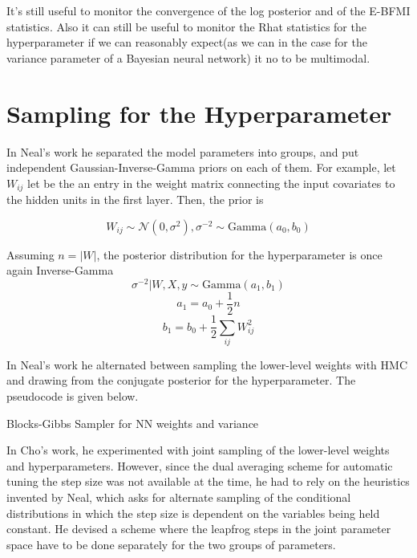 \documentclass[12pt]{report}
\begin{document}
It's still useful to monitor the convergence of the log posterior and of the E-BFMI statistics. Also it can still be useful to monitor the Rhat statistics for the hyperparameter if we can reasonably expect(as we can in the case for the variance parameter of a Bayesian neural network) it no to be multimodal. 



\section{Sampling for the Hyperparameter}

In Neal's work he separated the model parameters into groups, and put independent Gaussian-Inverse-Gamma priors on each of them. For example, let $W_{ij}$ let be the an entry in the weight matrix connecting the input covariates to the hidden units in the first layer. Then, the prior is 

\[W_{ij} \sim \mathcal{N}(0,\sigma^2), \sigma^{-2} \sim \text{Gamma}(a_0,b_0) \]

Assuming $n = |W|$, the  posterior distribution for the hyperparameter is once again Inverse-Gamma
\[\sigma^{-2}|W,X,y \sim \text{Gamma}(a_1,b_1)\]
\[a_1 = a_0 + \frac{1}{2} n  \]
\[b_1 = b_0 + \frac{1}{2} \sum_{ij} W_{ij}^2 \]

In Neal's work he alternated between sampling the lower-level weights with HMC and drawing from the conjugate posterior for the hyperparameter. The pseudocode is given below.
\begin{algorithm}

\caption{Blocks-Gibbs Sampler for NN weights and variance}
\end{algorithm}

In Cho's work, he experimented with joint sampling of the lower-level weights and hyperparameters. However, since the dual averaging scheme for automatic tuning the step size was not available at the time, he had to rely on the heuristics invented by Neal, which asks for alternate sampling of the conditional distributions in which the step size is dependent on the variables being held constant. He devised a scheme where the leapfrog steps in the joint parameter space have to be done separately for the two groups of parameters. 
\end{document}
